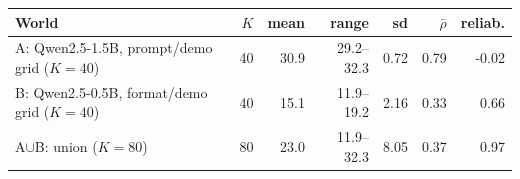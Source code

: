\begin{tabular}{lrrrrrr}\toprule
World & $K$ & mean & range & sd & $\bar\rho$ & reliab. \\\midrule
A: Qwen2.5-1.5B, prompt/demo grid ($K{=}40$) & 40 & 30.9 & 29.2--32.3 & 0.72 & 0.79 & -0.02 \\
B: Qwen2.5-0.5B, format/demo grid ($K{=}40$) & 40 & 15.1 & 11.9--19.2 & 2.16 & 0.33 & 0.66 \\
A$\cup$B: union ($K{=}80$) & 80 & 23.0 & 11.9--32.3 & 8.05 & 0.37 & 0.97 \\
\bottomrule
\end{tabular}
